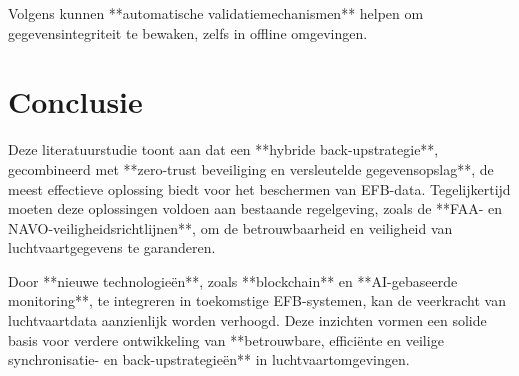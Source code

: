 \documentclass{hogent-article}
\begin{document}
    Volgens \textcite{Abdelaziz48PP100_116} kunnen **automatische validatiemechanismen** helpen om gegevensintegriteit te bewaken, zelfs in offline omgevingen.
    
    \section{Conclusie}
    
    Deze literatuurstudie toont aan dat een **hybride back-upstrategie**, gecombineerd met **zero-trust beveiliging en versleutelde gegevensopslag**, de meest effectieve oplossing biedt voor het beschermen van EFB-data. Tegelijkertijd moeten deze oplossingen voldoen aan bestaande regelgeving, zoals de **FAA- en NAVO-veiligheidsrichtlijnen**, om de betrouwbaarheid en veiligheid van luchtvaartgegevens te garanderen.
    
    Door **nieuwe technologieën**, zoals **blockchain** en **AI-gebaseerde monitoring**, te integreren in toekomstige EFB-systemen, kan de veerkracht van luchtvaartdata aanzienlijk worden verhoogd. Deze inzichten vormen een solide basis voor verdere ontwikkeling van **betrouwbare, efficiënte en veilige synchronisatie- en back-upstrategieën** in luchtvaartomgevingen.
    
    \printbibliography
    
\end{document}
